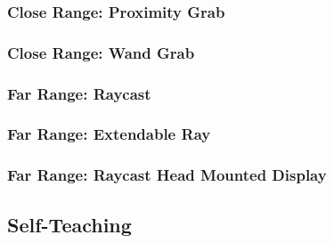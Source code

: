 \subsubsection{Close Range: Proximity Grab} \label{sec:ProximityGrab}
\subsubsection{Close Range: Wand Grab} \label{sec:WandGrab}


\subsubsection{Far Range: Raycast} \label{sec:Raycast}
\subsubsection{Far Range: Extendable Ray} \label{sec:ExtendableRay}
\subsubsection{Far Range: Raycast Head Mounted Display} \label{sec:RaycastHMD}





\subsection{Self-Teaching} \label{sec:selfteaching}

\newpage